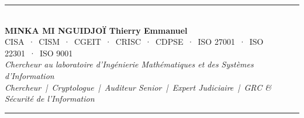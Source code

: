 \documentclass[12pt, twoside, openright, a4paper]{book}
\begin{document}
\vfill

\begin{center}
    {\color{CouleurAccent}\rule{0.7\linewidth}{1.2pt}}\\[1.2ex]
    {\color{white}\large\bfseries MINKA MI NGUIDJOÏ Thierry Emmanuel}\\[0.4ex]
    {\color{white!80!gray}\small
        CISA~·~CISM~·~CGEIT~·~CRISC~·~CDPSE~·~ISO 27001~·~ISO 22301~·~ISO 9001}\\[0.3ex]
    {\color{white!70!gray}\footnotesize\itshape
        Chercheur au laboratoire d'Ingénierie Mathématiques et des Systèmes d'Information}\\[0.3ex]
    {\color{white!70!gray}\footnotesize\itshape
        Chercheur~|~Cryptologue~|~Auditeur Senior~|~Expert Judiciaire~|~GRC \& Sécurité de l'Information}\\[1.2ex]
    {\color{CouleurAccent}\rule{0.7\linewidth}{1.2pt}}
\end{center}

\vspace{1cm}

\afterpage{\nopagecolor}
\end{document}
